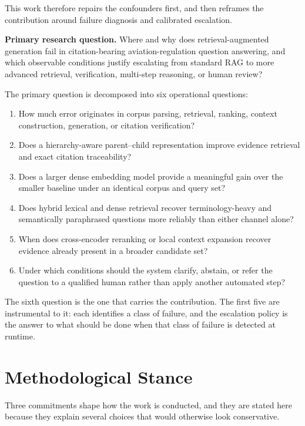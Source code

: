 This work therefore repairs the confounders first, and then reframes the contribution around failure diagnosis and calibrated escalation.

\begin{infobox}
\textbf{Primary research question.}
Where and why does retrieval-augmented generation fail in citation-bearing aviation-regulation question answering, and which observable conditions justify escalating from standard RAG to more advanced retrieval, verification, multi-step reasoning, or human review?
\end{infobox}

The primary question is decomposed into six operational questions:

\begin{enumerate}
  \item How much error originates in corpus parsing, retrieval, ranking, context construction, generation, or citation verification?
  \item Does a hierarchy-aware parent--child representation improve evidence retrieval and exact citation traceability?
  \item Does a larger dense embedding model provide a meaningful gain over the smaller baseline under an identical corpus and query set?
  \item Does hybrid lexical and dense retrieval recover terminology-heavy and semantically paraphrased questions more reliably than either channel alone?
  \item When does cross-encoder reranking or local context expansion recover evidence already present in a broader candidate set?
  \item Under which conditions should the system clarify, abstain, or refer the question to a qualified human rather than apply another automated step?
\end{enumerate}

The sixth question is the one that carries the contribution. The first five are instrumental to it: each identifies a class of failure, and the escalation policy is the answer to what should be done when that class of failure is detected at runtime.

\section{Methodological Stance}
\label{sec:intro-stance}

Three commitments shape how the work is conducted, and they are stated here because they explain several choices that would otherwise look conservative.

